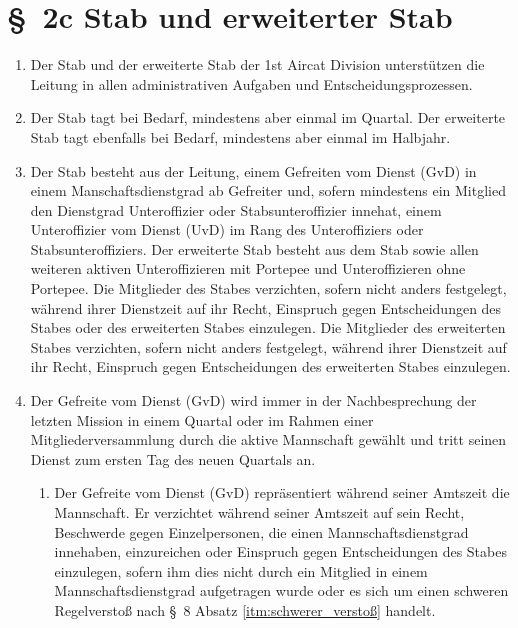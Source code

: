 \section*{\S~2c Stab und erweiterter Stab}
\label{sec:stab_und_erweiterter_stab}

\begin{enumerate}[label=(\arabic*)]
    \item Der Stab und der erweiterte Stab der 1st Aircat Division unterstützen die Leitung in allen administrativen Aufgaben und Entscheidungsprozessen.
    \item Der Stab tagt bei Bedarf, mindestens aber einmal im Quartal. Der erweiterte Stab tagt ebenfalls bei Bedarf, mindestens aber einmal im Halbjahr.
    \item Der Stab besteht aus der Leitung, einem Gefreiten vom Dienst (GvD) in einem Manschaftsdienstgrad ab Gefreiter und, sofern mindestens ein Mitglied den Dienstgrad Unteroffizier oder Stabsunteroffizier innehat, einem Unteroffizier vom Dienst (UvD) im Rang des Unteroffiziers oder Stabsunteroffiziers. Der erweiterte Stab besteht aus dem Stab sowie allen weiteren aktiven Unteroffizieren mit Portepee und Unteroffizieren ohne Portepee. Die Mitglieder des Stabes verzichten, sofern nicht anders festgelegt, während ihrer Dienstzeit auf ihr Recht, Einspruch gegen Entscheidungen des Stabes oder des erweiterten Stabes einzulegen. Die Mitglieder des erweiterten Stabes verzichten, sofern nicht anders festgelegt, während ihrer Dienstzeit auf ihr Recht, Einspruch gegen Entscheidungen des erweiterten Stabes einzulegen.
\item Der Gefreite vom Dienst (GvD) wird immer in der Nachbesprechung der letzten Mission in einem Quartal oder im Rahmen einer Mitgliederversammlung durch die aktive Mannschaft gewählt und tritt seinen Dienst zum ersten Tag des neuen Quartals an.

\begin{enumerate}[label=(\Alph*)]

    \item Der Gefreite vom Dienst (GvD) repr\"{a}sentiert w\"{a}hrend seiner Amtszeit die Mannschaft. Er verzichtet w\"{a}hrend seiner Amtszeit auf sein Recht, Beschwerde gegen Einzelpersonen, die einen Mannschaftsdienstgrad innehaben, einzureichen oder Einspruch gegen Entscheidungen des Stabes einzulegen, sofern ihm dies nicht durch ein Mitglied in einem Mannschaftsdienstgrad aufgetragen wurde oder es sich um einen schweren Regelversto\ss{} nach \S~8 Absatz \ref{itm:schwerer_verstoß} handelt.
    

\end{enumerate}
\end{enumerate}

